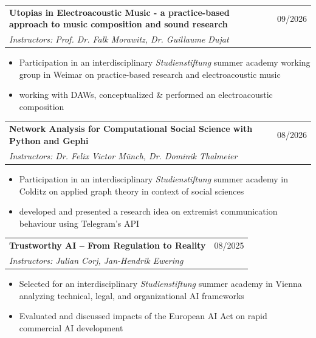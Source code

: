 \documentclass[11pt,a4paper]{article}
\begin{document}
\begin{tabularx}{\textwidth}{@{} X r @{}}
\textbf{Utopias in Electroacoustic Music - a practice-based approach to music composition and sound research} & 09/2026 \\
\textit{Instructors: Prof. Dr. Falk Morawitz, Dr. Guillaume Dujat} & 
\end{tabularx}
\vspace{-0.2cm}
\begin{itemize} \itemsep -2pt
    \item Participation in an interdisciplinary \textit{Studienstiftung} summer academy working group in Weimar on practice-based research and electroacoustic music
    \item working with DAWs, conceptualized \& performed an electroacoustic composition
\end{itemize}
\begin{tabularx}{\textwidth}{@{} X r @{}}
\textbf{Network Analysis for Computational Social Science with Python and Gephi} & 08/2026 \\
\textit{Instructors: Dr. Felix Victor Münch, Dr. Dominik Thalmeier} & 
\end{tabularx}
\vspace{-0.2cm}
\begin{itemize} \itemsep -2pt
    \item Participation in an interdisciplinary \textit{Studienstiftung} summer academy in Colditz on applied graph theory in context of social sciences
    \item developed and presented a research idea on extremist communication behaviour using Telegram's API
\end{itemize}
\begin{tabularx}{\textwidth}{@{} X r @{}}
\textbf{Trustworthy AI -- From Regulation to Reality} & 08/2025 \\
\textit{Instructors: Julian Corj, Jan-Hendrik Ewering} & 
\end{tabularx}
\vspace{-0.2cm}
\begin{itemize} \itemsep -2pt
    \item Selected for an interdisciplinary \textit{Studienstiftung} summer academy in Vienna analyzing technical, legal, and organizational AI frameworks
    \item Evaluated and discussed impacts of the European AI Act on rapid commercial AI development
\end{itemize}
\end{document}
